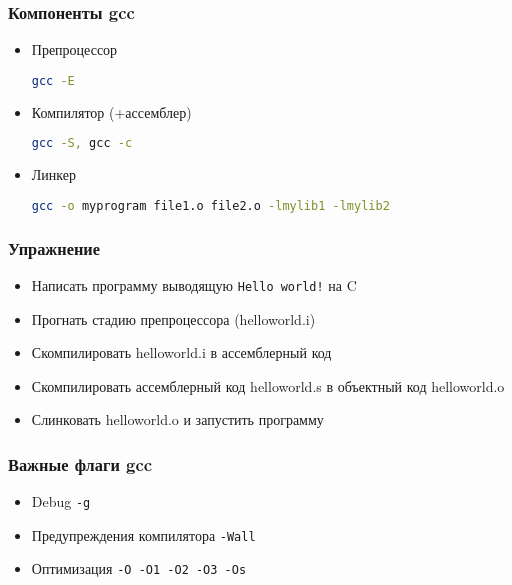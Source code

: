 
\begin{frame}[fragile]
\frametitle{Компоненты gcc}
\begin{itemize}
  \item Препроцессор
\begin{lstlisting}[language=sh]
gcc -E
\end{lstlisting}
  \item Компилятор (+ассемблер)
\begin{lstlisting}[language=sh]
gcc -S, gcc -c
\end{lstlisting}
  \item Линкер
\begin{lstlisting}[language=sh]
gcc -o myprogram file1.o file2.o -lmylib1 -lmylib2
\end{lstlisting}
\end{itemize}
\end{frame}

\begin{frame}
\frametitle{Упражнение}
\begin{itemize}
  \item Написать программу выводящую {\tt Hello world!} на C
  \item Прогнать стадию препроцессора (helloworld.i)
  \item Скомпилировать helloworld.i в ассемблерный код
  \item Скомпилировать ассемблерный код helloworld.s в объектный код helloworld.o
  \item Слинковать helloworld.o и запустить программу
\end{itemize}
\end{frame}

\begin{frame}
\frametitle{Важные флаги gcc}
\begin{itemize}
  \item Debug {\tt -g}
  \item Предупреждения компилятора {\tt -Wall}
  \item Оптимизация {\tt -O -O1 -O2 -O3 -Os}
\end{itemize}
\end{frame}

